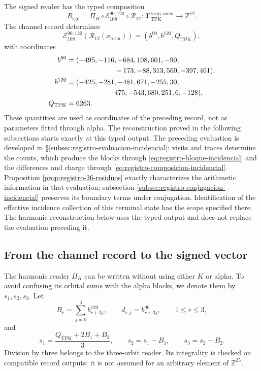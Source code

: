 The signed reader has the typed composition
\begin{equation}
 R_{\mathrm{sgn}}
 =\Pi_H\circ\mathcal E_{108}^{90,120}\circ\mathcal R_{12}:
 \mathcal X_{\mathrm{TPK}}^{\mathrm{term,mem}}
 \longrightarrow\mathbb Z^{12}.
 \label{eq:k-lector-firmado}
\end{equation}
The channel record determines
\[
 \mathcal E_{108}^{90,120}(\mathcal R_{12}(x_{\mathrm{term}}))
 =(b^{90},b^{120},Q_{\mathrm{TPK}}),
\]
with coordinates
\begin{align*}
 b^{90}={}&(-495,-116,-684,108,601,-90,\\
            &\hspace{19mm}-173,-88,313,560,-397,461),\\
 b^{120}={}&(-425,-281,-481,671,-255,30,\\
             &\hspace{19mm}475,-543,680,251,6,-128),\\
 Q_{\mathrm{TPK}}={}&6263.
\end{align*}
These quantities are used as coordinates of the preceding record, not
as parameters fitted through alpha. The reconstruction proved
in the following subsections starts exactly at this typed output.
The preceding evaluation is developed in
\S\ref{subsec:registro-evaluacion-incidencial}: visits and traces
determine the counts, which produce the blocks through
\eqref{eq:registro-bloque-incidencial} and the differences and charge through
\eqref{eq:registro-composicion-incidencial}. Proposition
\ref{prop:registro-36-residuos} exactly characterizes the
arithmetic information in that evaluation; subsection
\ref{subsec:registro-conjugacion-incidencial} preserves its boundary
terms under conjugation. Identification of the effective incidence collection
of this terminal state has the scope specified there.
The harmonic reconstruction below uses the typed output and does not
replace the evaluation preceding it.

\subsection{From the channel record to the signed vector}
\label{subsec:k-pi-h}

The harmonic reader \(\Pi_H\) can be written without using either \(K\) or
alpha. To avoid confusing its orbital sums with the alpha blocks,
we denote them by \(s_1,s_2,s_3\). Let
\[
 B_r=\sum_{j=0}^{3}b^{120}_{r+3j},\qquad
 d_{r,j}=b^{90}_{r+3j},\qquad1\leq r\leq3,
\]
and
\begin{equation}
 s_1=\frac{Q_{\mathrm{TPK}}+2B_1+B_2}{3},\qquad
 s_2=s_1-B_1,\qquad s_3=s_2-B_2.
 \label{eq:k-sumas-armonicas}
\end{equation}
Division by three belongs to the three-orbit reader. Its
integrality is checked on compatible record outputs; it is not
assumed for an arbitrary element of \(\mathbb Z^{25}\).

